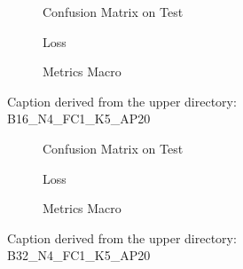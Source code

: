 \begin{figure}
    \centering
    \begin{subfigure}{0.3\linewidth}
        \centering
        
        \caption{Confusion Matrix on Test}
        \label{fig:confMatrixTest-4}
    \end{subfigure}
    \begin{subfigure}{0.3\linewidth}
        \centering
        
        \caption{Loss}
        \label{fig:loss-4}
    \end{subfigure}
    \begin{subfigure}{0.3\linewidth}
        \centering
        
        \caption{Metrics Macro}
        \label{fig:metricsMacro-4}
    \end{subfigure}

    \caption{Caption derived from the upper directory: B16\_N4\_FC1\_K5\_AP20}
    \label{fig:overallCaption-4}
\end{figure}



\begin{figure}
    \centering
    \begin{subfigure}{0.3\linewidth}
        \centering
        
        \caption{Confusion Matrix on Test}
        \label{fig:confMatrixTest-5}
    \end{subfigure}
    \begin{subfigure}{0.3\linewidth}
        \centering
        
        \caption{Loss}
        \label{fig:loss-5}
    \end{subfigure}
    \begin{subfigure}{0.3\linewidth}
        \centering
        
        \caption{Metrics Macro}
        \label{fig:metricsMacro-5}
    \end{subfigure}

    \caption{Caption derived from the upper directory: B32\_N4\_FC1\_K5\_AP20}
    \label{fig:overallCaption-5}
\end{figure}


